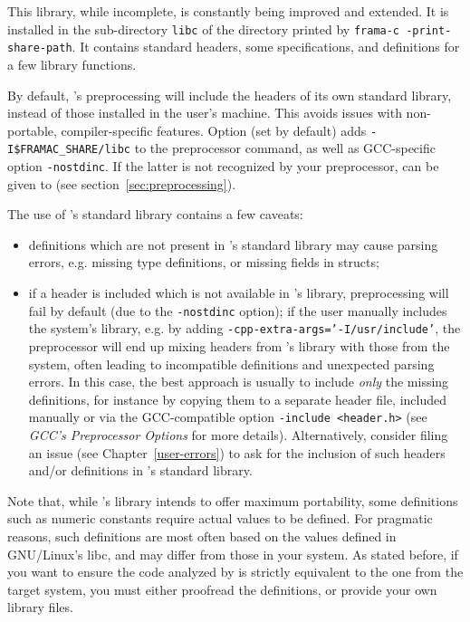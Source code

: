 This library, while incomplete, is constantly being improved and extended.
It is installed in the sub-directory \texttt{libc} of the directory printed by
\texttt{frama-c -print-share-path}. It contains standard \C headers,
some \acsl specifications, and definitions for a few library functions.

By default, \FramaC's preprocessing will include the headers of its own standard
library, instead of those installed in the user's machine. This avoids issues
with non-portable, compiler-specific features.
Option  (set by default)
adds \texttt{-I\$FRAMAC\_SHARE/libc} to the preprocessor command, as well as
GCC-specific option \texttt{-nostdinc}. If the latter is not recognized by
your preprocessor,
 can be given to \FramaC
(see section~\ref{sec:preprocessing}).

The use of \FramaC's standard library contains a few caveats:
\begin{itemize}
\item definitions which are not present in \FramaC's standard library may cause
  parsing errors, e.g. missing type definitions, or missing fields in structs;
\item if a header is included which is not available in \FramaC's library,
  preprocessing will fail by default (due to the \texttt{-nostdinc} option);
  if the user manually includes the system's library, e.g. by adding
  \texttt{-cpp-extra-args='-I/usr/include'}, the preprocessor will end up
  mixing headers from \FramaC's library with those from the system, often
  leading to incompatible definitions and unexpected parsing errors.
  In this case, the best approach is usually to include {\em only} the missing
  definitions, for instance by copying them to a separate header file, included
  manually or via the GCC-compatible option \texttt{-include <header.h>}
  (see {\em GCC's Preprocessor Options} for more details). Alternatively,
  consider filing an issue (see Chapter~\ref{user-errors}) to ask for the
  inclusion of such headers and/or definitions in \FramaC's standard library.
\end{itemize}

Note that, while \FramaC's library intends to offer maximum portability, some
definitions such as numeric constants require actual values to be defined.
For pragmatic reasons, such definitions are most often based on the values
defined in GNU/Linux's libc, and may differ from those in your system.
As stated before, if you want to ensure the code analyzed by \FramaC is
strictly equivalent to the one from the target system, you must either
proofread the definitions, or provide your own library files.

